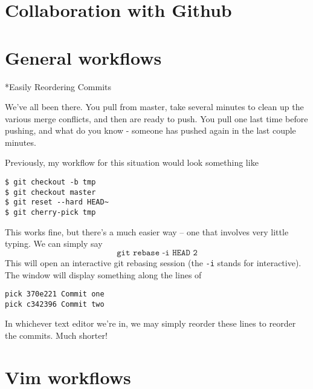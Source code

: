 \documentclass{amsart}
\makeatletter
\renewcommand\subsection{\@startsection{subsection}{2}%
  \z@{-.5\linespacing\@plus-.7\linespacing}{.5\linespacing}%
  {\normalfont\scshape}}
\makeatother
\begin{document}
\newpage

\section*{Collaboration with Github}

\newpage

\section*{General workflows}

\subsection*{Easily Reordering Commits}

We’ve all been there. You pull from master, take several minutes to clean up the various merge conflicts, and then are ready to push. You pull one last time before pushing, and what do you know - someone has pushed again in the last couple minutes.

Previously, my workflow for this situation would look something like
\begin{verbatim}
$ git checkout -b tmp
$ git checkout master
$ git reset --hard HEAD~
$ git cherry-pick tmp
\end{verbatim}

This works fine, but there’s a much easier way -- one that involves very little typing. We can simply say
\[
  \texttt{git rebase -i HEAD~2}
\]
This will open an interactive git rebasing session (the \texttt{-i} stands for interactive). The window will display something along the lines of
\begin{verbatim}
pick 370e221 Commit one
pick c342396 Commit two
\end{verbatim}
In whichever text editor we’re in, we may simply reorder these lines to reorder the commits. Much shorter!

\section*{Vim workflows}
\end{document}
